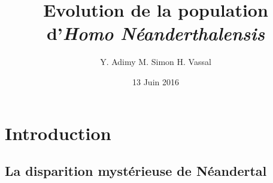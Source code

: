\documentclass[10pt]{beamer}
\title[Population Néanderthal]{\textbf{Evolution de la population \\ d'\textit{Homo Néanderthalensis}}}
\author[Y. Adimy, M. Simon, H. Vassal]{Y. Adimy M. Simon H. Vassal}
\institute[]{INSA Lyon - Bioinformatique et Modélisation}
\date{13 Juin 2016}
\begin{document}

\begin{frame} 
   \titlepage
   \insertlogo
\end{frame}






\section{Introduction}
\subsection{La disparition mystérieuse de Néandertal}
\end{document}
